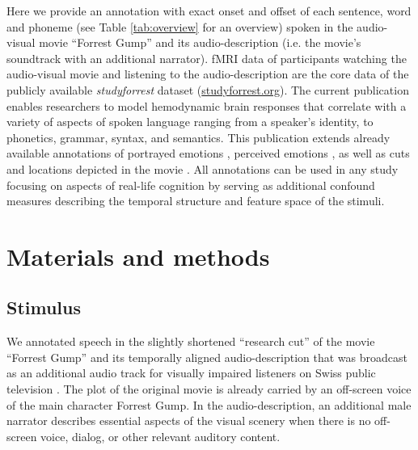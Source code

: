 \documentclass[10pt,a4paper,onecolumn]{article}
\begin{document}
Here we provide an annotation with exact onset and offset of each
sentence, word and phoneme (see Table \ref{tab:overview} for an overview) spoken
in the audio-visual movie ``Forrest Gump'' \citep{ForrestGumpMovie} and its
audio-description (i.e. the movie's soundtrack with an additional
narrator)\citep{ForrestGumpGermanAD}.
fMRI data of participants watching the audio-visual movie
\citep{hanke2016simultaneous} and listening to the audio-description
\citep{hanke2014audiomovie} are the core data of the publicly available
\textit{studyforrest} dataset (\href{www.studyforrest.org}{studyforrest.org}).
The current publication enables researchers to model hemodynamic brain responses
that correlate with a variety of aspects of spoken language ranging from a
speaker's identity, to phonetics, grammar, syntax, and semantics.
This publication extends already available annotations of portrayed emotions
\citep{labs2015portrayed}, perceived emotions \citep{lettieri2019emotionotopy},
as well as cuts and locations depicted in the movie
\citep{haeusler2016annotation}.
All annotations can be used in any study focusing on aspects of real-life
cognition by serving as additional confound measures describing the  temporal
structure and feature space of the stimuli.


\section*{Materials and methods}

\subsection*{Stimulus}
We annotated speech in the slightly shortened ``research cut''
\citep{hanke2014audiomovie} of the movie ``Forrest Gump'' and its temporally
aligned audio-description \citep{hanke2016simultaneous} that was broadcast as
an additional audio track for visually impaired listeners on Swiss public
television \citep{ForrestGumpGermanAD}.
The plot of the original movie is already carried by an off-screen voice of the
main character Forrest Gump. In the audio-description, an additional male
narrator describes essential aspects of the visual scenery when
there is no off-screen voice, dialog, or other relevant auditory content.
\end{document}

